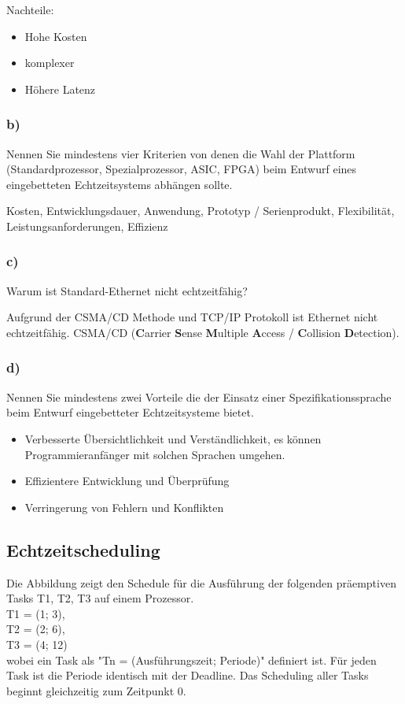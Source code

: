 Nachteile:
\begin{itemize}
  \item Hohe Kosten
  \item komplexer
  \item Höhere Latenz
\end{itemize}

\subsubsection{b)}
Nennen Sie mindestens vier Kriterien von denen die Wahl der Plattform (Standardprozessor,
Spezialprozessor, ASIC, FPGA) beim Entwurf eines eingebetteten Echtzeitsystems abhängen sollte.

Kosten, Entwicklungsdauer, Anwendung, Prototyp / Serienprodukt, Flexibilität, Leistungsanforderungen, Effizienz

\subsubsection{c)}
Warum ist Standard-Ethernet nicht echtzeitfähig?

Aufgrund der CSMA/CD Methode und TCP/IP Protokoll ist Ethernet nicht echtzeitfähig.
CSMA/CD (\textbf{C}arrier \textbf{S}ense \textbf{M}ultiple \textbf{A}ccess / \textbf{C}ollision \textbf{D}etection).

\subsubsection{d)}
Nennen Sie mindestens zwei Vorteile die der Einsatz einer Spezifikationssprache beim Entwurf
eingebetteter Echtzeitsysteme bietet.

\begin{itemize}
  \item Verbesserte Übersichtlichkeit und Verständlichkeit, es können Programmieranfänger mit solchen Sprachen umgehen.
  \item Effizientere Entwicklung und Überprüfung
  \item Verringerung von Fehlern und Konflikten
\end{itemize}

\subsection{Echtzeitscheduling}
Die Abbildung zeigt den Schedule für die Ausführung der folgenden präemptiven Tasks T1, T2, T3 auf einem
Prozessor.\\
T1 = (1; 3),\\
T2 = (2; 6),\\
T3 = (4; 12)\\
wobei ein Task als "Tn = (Ausführungszeit; Periode)" definiert ist. Für jeden Task ist die Periode identisch
mit der Deadline. Das Scheduling aller Tasks beginnt gleichzeitig zum Zeitpunkt 0.

